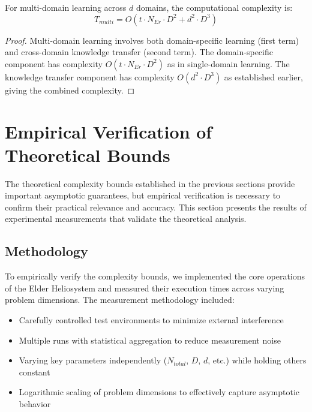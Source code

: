 \begin{theorem}
For multi-domain learning across $d$ domains, the computational complexity is:
\begin{equation}
T_{multi} = O(t \cdot N_{Er} \cdot D^2 + d^2 \cdot D^3)
\end{equation}
\end{theorem}

\begin{proof}
Multi-domain learning involves both domain-specific learning (first term) and cross-domain knowledge transfer (second term). The domain-specific component has complexity $O(t \cdot N_{Er} \cdot D^2)$ as in single-domain learning. The knowledge transfer component has complexity $O(d^2 \cdot D^3)$ as established earlier, giving the combined complexity.
\end{proof}

\section{Empirical Verification of Theoretical Bounds}



The theoretical complexity bounds established in the previous sections provide important asymptotic guarantees, but empirical verification is necessary to confirm their practical relevance and accuracy. This section presents the results of experimental measurements that validate the theoretical analysis.

\subsection{Methodology}

To empirically verify the complexity bounds, we implemented the core operations of the Elder Heliosystem and measured their execution times across varying problem dimensions. The measurement methodology included:

\begin{itemize}
    \item Carefully controlled test environments to minimize external interference
    \item Multiple runs with statistical aggregation to reduce measurement noise
    \item Varying key parameters independently ($N_{total}$, $D$, $d$, etc.) while holding others constant
    \item Logarithmic scaling of problem dimensions to effectively capture asymptotic behavior
\end{itemize}

